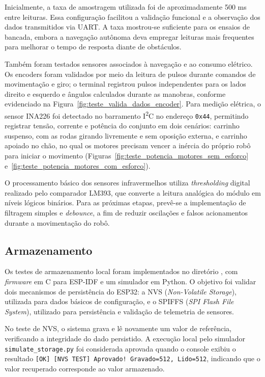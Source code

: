Inicialmente, a taxa de amostragem utilizada foi de aproximadamente 500 ms entre
leituras. Essa configuração facilitou a validação funcional e a observação dos
dados transmitidos via UART. A taxa mostrou-se suficiente para os ensaios de
bancada, embora a navegação autônoma deva empregar leituras mais frequentes para
melhorar o tempo de resposta diante de obstáculos.

Também foram testados sensores associados à navegação e ao consumo elétrico. Os
encoders foram validados por meio da leitura de pulsos durante comandos de
movimentação e giro; o terminal registrou pulsos independentes para os lados
direito e esquerdo e ângulos calculados durante as manobras, conforme evidenciado
na Figura~\ref{fig:teste_valida_dados_encoder}. Para medição elétrica, o sensor
INA226 foi detectado no barramento I\textsuperscript{2}C no endereço
\texttt{0x44}, permitindo registrar tensão, corrente e potência do conjunto em
dois cenários: carrinho suspenso, com as rodas girando livremente e sem oposição
externa, e carrinho apoiado no chão, no qual os motores precisam vencer a inércia
do próprio robô para iniciar o movimento
(Figuras~\ref{fig:teste_potencia_motores_sem_esforco}
e~\ref{fig:teste_potencia_motores_com_esforco}).

O processamento básico dos sensores infravermelhos utiliza
\textit{thresholding} digital realizado pelo comparador LM393, que converte a
leitura analógica do módulo em níveis lógicos binários. Para as próximas etapas,
prevê-se a implementação de filtragem simples e \textit{debounce}, a fim de
reduzir oscilações e falsos acionamentos durante a movimentação do robô.

\subsection{Armazenamento}

Os testes de armazenamento local foram implementados no diretório
, com \textit{firmware} em C para ESP-IDF e
um simulador em Python. O objetivo foi validar dois mecanismos de persistência
do ESP32: a NVS (\textit{Non-Volatile Storage}), utilizada para dados básicos de
configuração, e o SPIFFS (\textit{SPI Flash File System}), utilizado para
persistência e validação de telemetria de sensores.

No teste de NVS, o sistema grava e lê novamente um valor de referência,
verificando a integridade do dado persistido. A execução local pelo simulador
\texttt{simulate\_storage.py} foi considerada aprovada quando o console exibiu o
resultado \texttt{[OK] [NVS TEST] Aprovado! Gravado=512, Lido=512}, indicando que
o valor recuperado corresponde ao valor armazenado.

